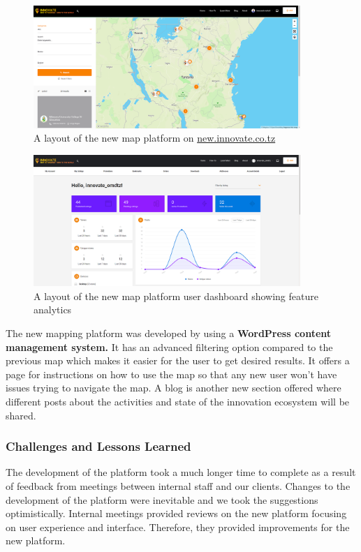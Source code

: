 \documentclass[a4paper,12pt,twoside]{article}
\begin{document}
\begin{figure}[h]
	\includegraphics[width=0.9\textwidth]{images/new_new_inno_map.png}
	\caption{A layout of the new map platform on \href{http://new.innovate.co.tz}{new.innovate.co.tz }}
\end{figure}
\begin{figure}[h]
	\includegraphics[width=0.9\textwidth]{images/dashboard.png}
	\caption{A layout of the new map platform user dashboard showing feature analytics }
\end{figure}

The new mapping platform was developed by using a \textbf{WordPress content management system.} It has an advanced filtering option compared to the previous map which makes it easier for the user to get desired results. It offers a page for instructions on how to use the map so that any new user won't have issues trying to navigate the map. A blog is another new section offered where different posts about the activities and state of the innovation ecosystem will be shared.

\subsubsection{Challenges and Lessons Learned}
The development of the platform took a much longer time to complete as a result of feedback from meetings between internal staff and our clients. Changes to the development of the platform were inevitable and we took the suggestions optimistically. Internal meetings provided reviews on the new platform focusing on user experience and interface. Therefore, they provided improvements for the new platform.
\end{document}
